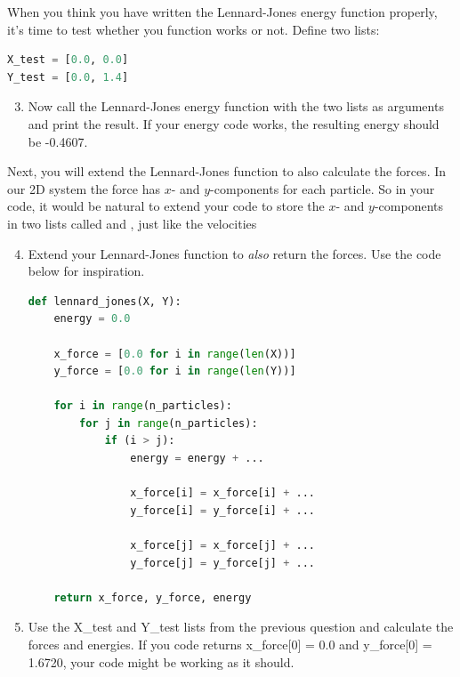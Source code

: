 \documentclass{article}
\begin{document}
When you think you have written the Lennard-Jones energy function properly,
it's time to test whether you function works or not.
Define two lists:

\begin{lstlisting}[language=python]
X_test = [0.0, 0.0]
Y_test = [0.0, 1.4]
\end{lstlisting}


\begin{enumerate}
    \setcounter{enumi}{2}

    \item Now call the Lennard-Jones energy function with the two lists as
        arguments and print the result. If your energy code works, the
        resulting energy should be -0.4607.

\end{enumerate}

Next, you will extend the Lennard-Jones function to also calculate
the forces. In our 2D system the force has $x$- and $y$-components for each
particle.
So in your code, it would be natural to extend your code to store the $x$- and
$y$-components in two lists called  and , just
like the velocities

\begin{enumerate}
    \setcounter{enumi}{3}

    \item Extend your Lennard-Jones function to \textit{also} return the forces.
        Use the code below for inspiration.

\begin{lstlisting}[language=python]
def lennard_jones(X, Y):
    energy = 0.0

    x_force = [0.0 for i in range(len(X))]
    y_force = [0.0 for i in range(len(Y))]

    for i in range(n_particles):
        for j in range(n_particles):
            if (i > j):
                energy = energy + ...

                x_force[i] = x_force[i] + ...
                y_force[i] = y_force[i] + ...

                x_force[j] = x_force[j] + ...
                y_force[j] = y_force[j] + ...

    return x_force, y_force, energy

\end{lstlisting}

    \item Use the X\_test and Y\_test lists from the previous question and
        calculate the forces and energies.
        If you code returns x\_force[0] = 0.0 and y\_force[0] = 1.6720, your
        code might be working as it should.

\end{enumerate}
\end{document}
